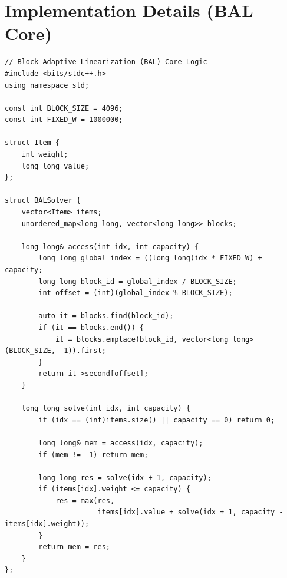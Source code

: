 \documentclass[a4paper,USenglish]{lipics-v2021}
\begin{document}
\section{Implementation Details (BAL Core)}
\begin{lstlisting}
// Block-Adaptive Linearization (BAL) Core Logic
#include <bits/stdc++.h>
using namespace std;

const int BLOCK_SIZE = 4096;
const int FIXED_W = 1000000;

struct Item {
    int weight;
    long long value;
};

struct BALSolver {
    vector<Item> items;
    unordered_map<long long, vector<long long>> blocks;

    long long& access(int idx, int capacity) {
        long long global_index = ((long long)idx * FIXED_W) + capacity;
        long long block_id = global_index / BLOCK_SIZE;
        int offset = (int)(global_index % BLOCK_SIZE);

        auto it = blocks.find(block_id);
        if (it == blocks.end()) {
            it = blocks.emplace(block_id, vector<long long>(BLOCK_SIZE, -1)).first;
        }
        return it->second[offset];
    }

    long long solve(int idx, int capacity) {
        if (idx == (int)items.size() || capacity == 0) return 0;

        long long& mem = access(idx, capacity);
        if (mem != -1) return mem;

        long long res = solve(idx + 1, capacity);
        if (items[idx].weight <= capacity) {
            res = max(res,
                      items[idx].value + solve(idx + 1, capacity - items[idx].weight));
        }
        return mem = res;
    }
};
\end{lstlisting}
\end{document}
